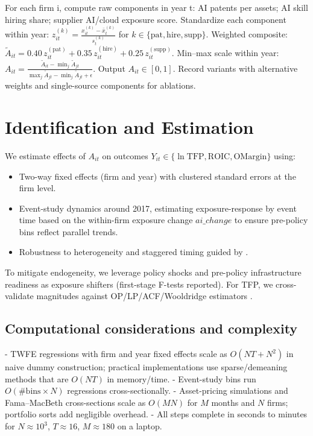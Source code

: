 \begin{algorithm}[h]
\caption{AI Adoption Index Construction (year t)}
\label{alg:aiindex}
\begin{algorithmic}[1]
\State For each firm i, compute raw components in year t: AI patents per assets; AI skill hiring share; supplier AI/cloud exposure score.
\State Standardize each component within year: $z_{it}^{(k)} = \frac{x_{it}^{(k)} - \bar{x}_t^{(k)}}{s_t^{(k)}}$ for $k \in \{\text{pat}, \text{hire}, \text{supp}\}$.
\State Weighted composite: $\tilde{A}_{it} = 0.40\, z_{it}^{(\text{pat})} + 0.35\, z_{it}^{(\text{hire})} + 0.25\, z_{it}^{(\text{supp})}$.
\State Min–max scale within year: $A_{it} = \frac{\tilde{A}_{it} - \min_j \tilde{A}_{jt}}{\max_j \tilde{A}_{jt} - \min_j \tilde{A}_{jt} + \epsilon}$.
\State Output $A_{it} \in [0,1]$. Record variants with alternative weights and single-source components for ablations.
\end{algorithmic}
\end{algorithm}

\section{Identification and Estimation}
We estimate effects of $A_{it}$ on outcomes $Y_{it} \in \{\ln \mathrm{TFP}, \mathrm{ROIC}, \mathrm{OMargin}\}$ using:
\begin{itemize}
    \item Two-way fixed effects (firm and year) with clustered standard errors at the firm level.
    \item Event-study dynamics around 2017, estimating exposure-response by event time based on the within-firm exposure change $ai\_change$ to ensure pre-policy bins reflect parallel trends.
    \item Robustness to heterogeneity and staggered timing guided by \citet{SunAbraham2021, CallawaySantanna2021}.
\end{itemize}
To mitigate endogeneity, we leverage policy shocks and pre-policy infrastructure readiness as exposure shifters (first-stage F-tests reported). For TFP, we cross-validate magnitudes against OP/LP/ACF/Wooldridge estimators \citep{OlleyPakes1996, LevinsohnPetrin2003, AckerbergCavesFrazer2015, Wooldridge2009}.

\subsection*{Computational considerations and complexity}
- TWFE regressions with firm and year fixed effects scale as $O(NT + N^2)$ in naive dummy construction; practical implementations use sparse/demeaning methods that are $O(NT)$ in memory/time.
- Event-study bins run $O(\#\text{bins} \times N)$ regressions cross-sectionally.
- Asset-pricing simulations and Fama–MacBeth cross-sections scale as $O(MN)$ for $M$ months and $N$ firms; portfolio sorts add negligible overhead.
- All steps complete in seconds to minutes for $N\approx 10^3$, $T\approx 16$, $M\approx 180$ on a laptop.

